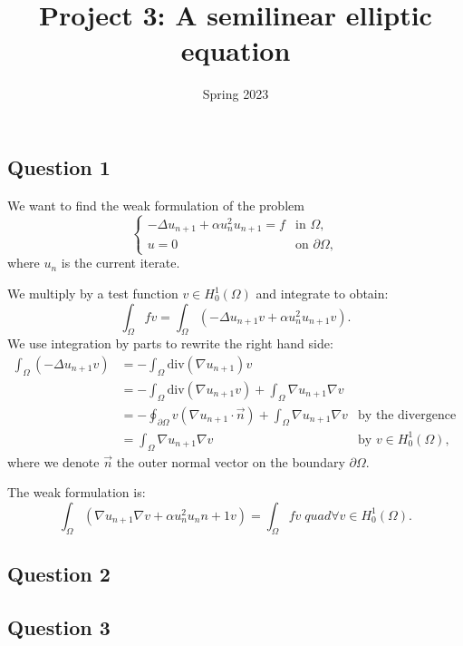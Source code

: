 \documentclass[11pt, a4paper, twoside]{article}
\newcommand{\grad}{\nabla} %
\renewcommand{\div}{\text{div}} %
\newcommand{\Hunz}{H^1_0(\Omega)}
\newcommand{\intom}{\int_\Omega}
\newcommand{\intbd}{\oint_{\partial \Omega}}
\begin{document}
\title{Project 3: A semilinear elliptic equation}
\author{}
\date{Spring 2023}
\maketitle 

\subsection*{Question 1}
We want to find the weak formulation of the problem
$$\begin{cases}  - \Delta u_{n+1} + \alpha u_n^2 u_{n+1} = f & \text{in } \Omega,\\
u = 0 &\text{on } \partial\Omega,
\end{cases}$$
where $u_n$ is the current iterate.\newline

We multiply by a test function $v\in \Hunz$ and integrate to obtain:
$$\intom fv = \intom \left( -\Delta u_{n+1} v + \alpha u_n^2 u_{n+1} v \right).$$
We use integration by parts to rewrite the right hand side:
\begin{align*}
 \intom (-\Delta u_{n+1} v) &= - \intom \div(\grad u_{n+1}) v \\
 &= - \intom \div(\grad u_{n+1} v) + \intom \grad u_{n+1} \grad v\\
 &= - \intbd v (\grad u_{n+1} \cdot \vec n) + \intom \grad u_{n+1} \grad v &\text{by the divergence theorem}\\
 &=  \intom \grad u_{n+1} \grad v &\text{by } v\in\Hunz,
\end{align*}
where we denote $\vec n$ the outer normal vector on the boundary $\partial \Omega$.

The weak formulation is:
\begin{equation}
\label{weak_f}
\intom \left( \grad u_{n+1} \grad v + \alpha u_n^2 u_n{n+1} v\right) = \intom fv \;quad\forall v\in\Hunz.
\end{equation}

\subsection*{Question 2}


\subsection*{Question 3}
\end{document}
